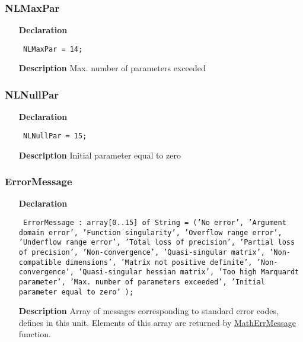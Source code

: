 \documentclass[12pt,a4paper,oneside]{report}
\newcommand{\lmath}[1]{   %
	\marginpar{\vspace{#1} 
		\begin{flushright}
			LMath
	\end{flushright} }
}
\newcommand{\declarationitem}[1]{\textbf{#1}}
\newcommand{\descriptiontitle}[1]{\textbf{#1}}
\newcommand{\code}[1]{\texttt{#1}}
\begin{document}
\subsubsection{NLMaxPar}
\label{uErrors-NLMaxPar}
\begin{itemize}\item[\declarationitem{Declaration}\hfill]
	\begin{flushleft}
		\code{
			NLMaxPar  = 14;}
		
	\end{flushleft}
	
	\par
	\item[\descriptiontitle{Description}]
	Max. number of parameters exceeded
	
\end{itemize}
\subsubsection{NLNullPar}
\label{uErrors-NLNullPar}
\begin{itemize}\item[\declarationitem{Declaration}\hfill]
	\begin{flushleft}
		\code{
			NLNullPar = 15;}
		
	\end{flushleft}
	
	\par
	\item[\descriptiontitle{Description}]
	Initial parameter equal to zero
	
\end{itemize}
\subsubsection{ErrorMessage}
\lmath{-24pt}
\label{uErrors-ErrorMessage}
\begin{itemize}\item[\declarationitem{Declaration}\hfill]
	\begin{flushleft}
		\code{
			ErrorMessage : array[0..15] of String =
			('No error',
			'Argument domain error',
			'Function singularity',
			'Overflow range error',
			'Underflow range error',
			'Total loss of precision',
			'Partial loss of precision',
			'Non-convergence',
			'Quasi-singular matrix',
			'Non-compatible dimensions',
			'Matrix not positive definite',
			'Non-convergence',
			'Quasi-singular hessian matrix',
			'Too high Marquardt parameter',
			'Max. number of parameters exceeded',
			'Initial parameter equal to zero'
			);}
	\end{flushleft}
\item[\descriptiontitle{Description}] Array of messages corresponding to standard error codes, defines in this unit. Elements of this array are returned by \hyperref[uErrors-MathErrMessage]{MathErrMessage} function.	
\end{itemize}
\end{document}
